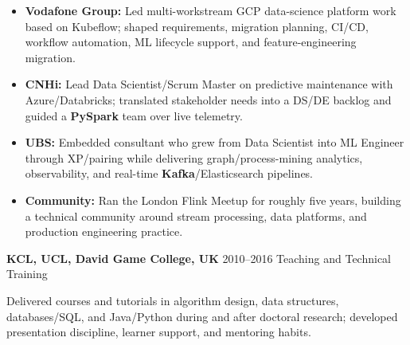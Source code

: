 \documentclass[]{../../../../friggeri-cv}
\renewcommand{\entry}[4]{%
  \parbox[t]{\dimexpr\textwidth-\entryleftinset\relax}{%
    \textbf{#2}%
    {\footnotesize\addfontfeature{Color=lightgray}\hspace{0.6em}#1}%
    \hfill%
    {\small\color{textcolor} #3}\\%
    #4\vspace{\parsep}%
  }\\}
\begin{document}
\begin{entrylist}
{{        }
        \begin{itemize}[leftmargin=1.1em]
            \item \footnotesize\textbf{Vodafone Group:} Led multi-workstream GCP data-science platform work based on Kubeflow; shaped requirements, migration planning, CI/CD, workflow automation, ML lifecycle support, and feature-engineering migration.
            \item \footnotesize\textbf{CNHi:} Lead Data Scientist/Scrum Master on predictive maintenance with Azure/Databricks; translated stakeholder needs into a DS/DE backlog and guided a \textbf{PySpark} team over live telemetry.
            \item \footnotesize\textbf{UBS:} Embedded consultant who grew from Data Scientist into ML Engineer through XP/pairing while delivering graph/process-mining analytics, observability, and real-time \textbf{Kafka}/Elasticsearch pipelines.
            \item \footnotesize\textbf{Community:} Ran the London Flink Meetup for roughly five years, building a technical community around stream processing, data platforms, and production engineering practice.
        \end{itemize}
    }
    \entry
    {2010--2016}
    {KCL, UCL, David Game College, UK}
    {Teaching and Technical Training}
    {
        {\small
        \setlength{\parindent}{0pt}
        \setlength{\leftskip}{0pt}
        Delivered courses and tutorials in algorithm design, data structures, databases/SQL, and Java/Python during and after doctoral research; developed presentation discipline, learner support, and mentoring habits.

        }
    }
\end{entrylist}
\newpage
\setlength{\parskip}{2pt}
\setlength{\parsep}{0pt}
\end{document}
